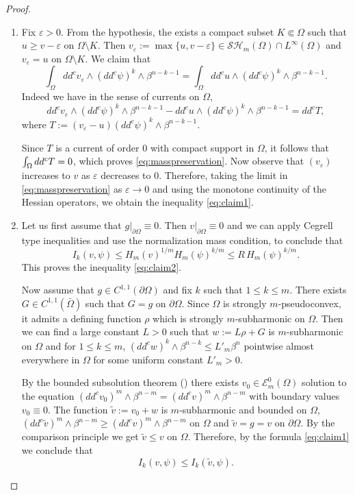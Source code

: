 \documentclass[JEP,XML,SOM,Unicode]{cedram}
\theoremstyle{definition}
\begin{document}
\skpt
\begin{proof}
\begin{enumerate}
\item
Fix $\varepsilon > 0$. From the hypothesis, the exists a compact subset $K \Subset \Omega$ such that $ u \geq v - \varepsilon$ on $\Omega \setminus K$. Then $v_\varepsilon := \max \{u,v-\varepsilon\} \in \mathcal{SH}_m (\Omega) \cap L^{\infty} (\Omega)$ and $v_\varepsilon = u$ on $\Omega \setminus K$.
We claim that
\begin{equation} \label{eq:masspreservation}
\int_{\Omega} dd^c v_\varepsilon \wedge (dd^c \psi)^{k} \wedge\beta^{n-k-1} = \int_{\Omega} dd^c u \wedge (dd^c \psi)^k \wedge\beta^{n-k-1}.
\end{equation}
Indeed we have in the sense of currents on $\Omega$,
\[
dd^c v_\varepsilon \wedge (dd^c \psi)^{k} \wedge\beta^{n-k-1} - dd^c u \wedge (dd^c \psi)^k \wedge\beta^{n-k-1} = dd^c T,
\]
where $T := (v_\varepsilon - u) (dd^c \psi)^k \wedge\beta^{n-k-1}$.

Since $T$ is a current of order $0$ with compact support in $\Omega$, it follows that $\int_\Omega dd^c T =\nobreak 0$, which proves \eqref{eq:masspreservation}.
Now observe that $(v_\varepsilon)$ increases to $v$ as $\varepsilon$ decreases to $0$. Therefore, taking the limit in \eqref{eq:masspreservation} as $\varepsilon \to 0$ and using the monotone continuity of the Hessian operators, we obtain the inequality \eqref{eq:claim1}.

\item
Let us first assume that $g|_{\partial \Omega} \equiv 0$. Then $v|_{\partial \Omega} \equiv 0$ and we can apply Cegrell type inequalities \cite[Lem.\,2.8]{BZ20} and use the normalization mass condition, to conclude that
\[
I_k(v,\psi) \leq H_m (v)^{1\slash m} H_m (\psi)^{k \slash m}
\leq  R \, H_m (\psi)^{k \slash m}.
\]
This proves the inequality \eqref{eq:claim2}.

Now assume that $g \in C^{1,1} (\partial \Omega)$ and fix $k$ such that $1 \leq k \leq m$.
There exists $G \in C^{1,1} (\bar{\Omega})$ such that $G = g$ on $\partial \Omega$. Since $\Omega$ is strongly $m$-pseudoconvex, it admits a defining function $\rho$ which is strongly $m$-subharmonic on $\Omega$. Then we can find a large constant $L > 0$ such that $w := L \rho + G$ is $m$-subharmonic on $\Omega$ and for $1 \leq k \leq m$, $(dd^c w)^k \wedge \beta^{n-k} \leq L'_m \beta^n$ pointwise almost everywhere in $\Omega$ for some uniform constant $L'_m > 0$.

By the bounded subsolution theorem (\cite{N13}) there exists $v_0 \in \mathcal{E}^0_m (\Omega)$ solution to the equation $(dd^c v_0)^m \wedge \beta^{n-m} = (dd^c v)^m \wedge \beta^{n-m}$ with boundary values $v_0 \equiv 0$.
The function $\tilde v := v_0 + w$ is $m$-subharmonic and bounded on $\Omega$, $(dd^c \tilde v)^m \wedge \beta^{n-m} \geq (dd^c v)^m \wedge \beta^{n-m} $ on $\Omega$ and $ \tilde v = g = v$ on $\partial \Omega$. By the comparison principle we get $\tilde v \leq v$ on $\Omega$.
Therefore, by the formula \eqref{eq:claim1} we conclude that
\[
I_k (v,\psi) \leq I_k (\tilde v,\psi).
\]


\end{enumerate}
\end{proof}
\end{document}
